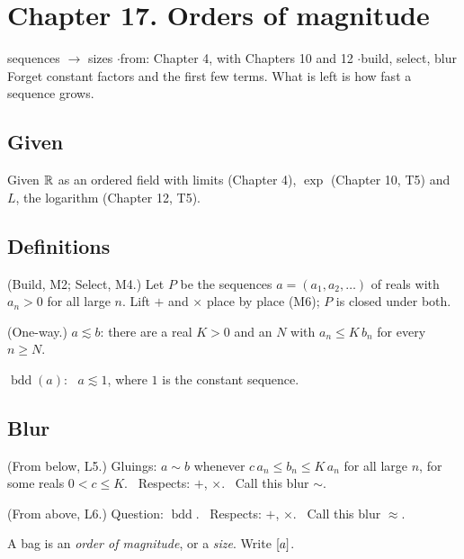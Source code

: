 \newpage

\section*{Chapter 17. Orders of magnitude}
\begin{center}
{\normalsize sequences $\to$ sizes \quad$\cdot$\quad from: Chapter 4, with Chapters 10 and 12 \quad$\cdot$\quad build, select, blur}\\[4pt]
{\small Forget constant factors and the first few terms. What is left is how fast a sequence grows.}
\end{center}

\subsection*{Given}

Given $\mathbb{R}$ as an ordered field with limits (Chapter 4), $\exp$ (Chapter 10, T5) and $L$, the logarithm (Chapter 12, T5).

\subsection*{Definitions}

\begin{lines}
\item[\lab{D1}] (Build, M2; Select, M4.) Let $P$ be the sequences $a = (a_1, a_2, \dots)$ of reals with $a_n > 0$ for all large $n$. Lift $+$ and $\times$ place by place (M6); $P$ is closed under both.
\item[\lab{D2}] (One-way.) $a \lesssim b$: there are a real $K > 0$ and an $N$ with $a_n \le K\, b_n$ for every $n \ge N$.
\item[\lab{D3}] $\operatorname{bdd}(a)$: \ $a \lesssim 1$, where $1$ is the constant sequence.
\end{lines}

\subsection*{Blur}

\begin{lines}
\item[\lab{B1}] (From below, L5.) Gluings: $a \sim b$ whenever $c\, a_n \le b_n \le K\, a_n$ for all large $n$, for some reals $0 < c \le K$. \ Respects: $+$, $\times$. \ Call this blur $\sim$.
\item[\lab{B2}] (From above, L6.) Question: $\operatorname{bdd}$. \ Respects: $+$, $\times$. \ Call this blur $\approx$.
\item[] A bag is an \emph{order of magnitude}, or a \emph{size}. Write $[a]$.
\end{lines}

